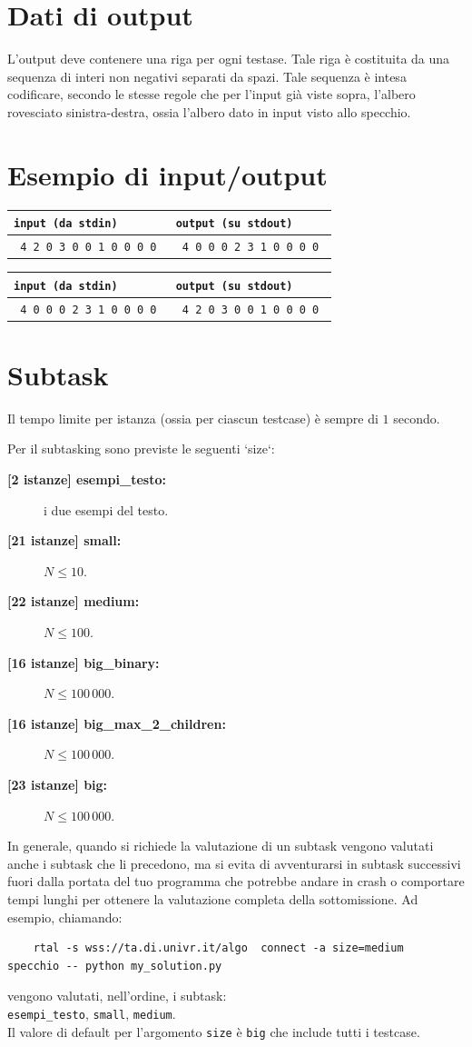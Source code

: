 \documentclass[a4paper,11pt]{article}
\newcommand{\file}[1]{\texttt{#1}}
\newcommand{\esempio}[2]{
\noindent\begin{minipage}{\textwidth}
\begin{tabular}{|p{11cm}|p{5cm}|}
	\hline
      \textbf{\file{input (da stdin)}} & \textbf{\file{output (su stdout)}}\\
	\hline
	\tt \small #1 &
	\tt \small #2 \\
	\hline
\end{tabular}
\end{minipage}
}
\begin{document}
\section*{Dati di output}

L'output deve contenere una riga per ogni testase. Tale riga è costituita da una sequenza di interi non negativi separati da spazi. Tale sequenza è intesa codificare, secondo le stesse regole che per l'input già viste sopra, l'albero rovesciato sinistra-destra, ossia l'albero dato in input visto allo specchio.

\section*{Esempio di input/output}
\esempio{
4 2 0 3 0 0 1 0 0 0 0
}{
4 0 0 0 2 3 1 0 0 0 0
}

\esempio{
4 0 0 0 2 3 1 0 0 0 0
}{
4 2 0 3 0 0 1 0 0 0 0
}


\section*{Subtask}

Il tempo limite per istanza (ossia per ciascun testcase) è sempre di $1$ secondo.

Per il subtasking sono previste le seguenti `size`:

\begin{description}
\item[\textbf{\hspace{1ex}[2 istanze] esempi\_testo:}] i due esempi del testo.
\item [\textbf{[21 istanze] small:}] $N \le 10$.
\item [\textbf{[22 istanze] medium:}] $N \le 100$.
\item [\textbf{[16 istanze] big\_binary:}] $N \le 100\,000$.
\item [\textbf{[16 istanze] big\_max\_2\_children:}] $N \le 100\,000$.
\item [\textbf{[23 istanze] big:}] $N \le 100\,000$.
\end{description}

In generale, quando si richiede la valutazione di un subtask vengono valutati anche i subtask che li precedono, ma si evita di avventurarsi in subtask successivi  fuori dalla portata del tuo programma che potrebbe andare in crash o comportare tempi lunghi per ottenere la valutazione completa della sottomissione. Ad esempio, chiamando:

\begin{verbatim}
    rtal -s wss://ta.di.univr.it/algo  connect -a size=medium  specchio -- python my_solution.py
\end{verbatim}

\noindent
vengono valutati, nell'ordine, i subtask:\\

{\tt esempi\_testo}, {\tt small}, {\tt medium}.\\

\noindent
Il valore di default per l'argomento {\tt size} è {\tt big} che include tutti i testcase.\\
\end{document}
